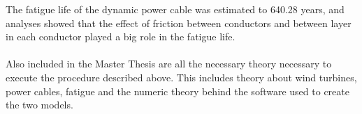 The fatigue life of the dynamic power cable was estimated to 640.28 years, and analyses showed that the effect of friction between conductors and between layer in each conductor played a big role in the fatigue life. \\\\
Also included in the Master Thesis are all the necessary theory necessary to execute the procedure described above. This includes theory about wind turbines, power cables, fatigue and the numeric theory behind the software used to create the two models. 

